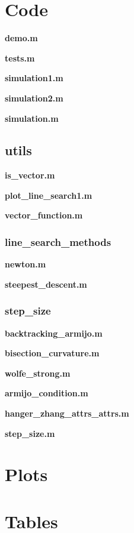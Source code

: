\documentclass[a4paper,11pt]{article}
\numberwithin{equation}{section} %
\begin{document}
\label{code}
\section{Code}

\textbf{demo.m}

% 
\textbf{tests.m}

\textbf{simulation1.m}

\textbf{simulation2.m}

\textbf{simulation.m}



\subsection{utils}
\textbf{is\_vector.m}

\textbf{plot\_line\_search1.m}

\textbf{vector\_function.m}


\subsubsection{line\_search\_methods}
\textbf{newton.m}

\textbf{steepest\_descent.m}


\subsubsection{step\_size}
\textbf{backtracking\_armijo.m}

\textbf{bisection\_curvature.m}

\textbf{wolfe\_strong.m}

\textbf{armijo\_condition.m}

\textbf{hanger\_zhang\_attrs\_attrs.m}

\textbf{step\_size.m}


\label{plots}
\section{Plots}




\label{tables}
\section{Tables}
\end{document}
